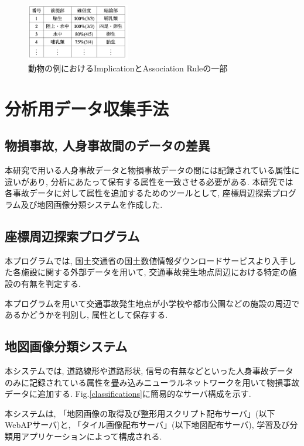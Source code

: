 \documentclass[a4j,8.5pt, twocolumn,fleqn]{jbook}
\begin{document}
\begin{figure}[htb]
    \centering
    \includegraphics[height=25mm]{images/implication.png}
    \vspace{-6mm}
    \caption{動物の例におけるImplicationとAssociation Ruleの一部}
    \label{implications}
\end{figure}


\section{分析用データ収集手法}
\subsection{物損事故, 人身事故間のデータの差異}
本研究で用いる人身事故データと物損事故データの間には記録されている属性に違いがあり, 分析にあたって保有する属性を一致させる必要がある. 
本研究では各事故データに対して属性を追加するためのツールとして, 座標周辺探索プログラム及び地図画像分類システムを作成した. 

\subsection{座標周辺探索プログラム}
本プログラムでは, 国土交通省の国土数値情報ダウンロードサービス\cite{国土数値情報ダウンロードサービス}より入手した各施設に関する外部データを用いて, 交通事故発生地点周辺における特定の施設の有無を判定する. 

本プログラムを用いて交通事故発生地点が小学校や都市公園などの施設の周辺であるかどうかを判別し, 属性として保存する. 

\subsection{地図画像分類システム}
本システムでは, 道路線形や道路形状, 信号の有無などといった人身事故データのみに記録されている属性を畳み込みニューラルネットワークを用いて物損事故データに追加する. Fig.\ref{classifications}に簡易的なサーバ構成を示す. 

本システムは, 「地図画像の取得及び整形用スクリプト配布サーバ」(以下WebAPサーバ)と, 「タイル画像配布サーバ」(以下地図配布サーバ), 学習及び分類用アプリケーションによって構成される. 
\end{document}
